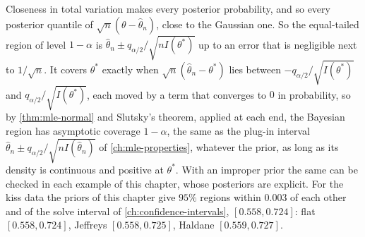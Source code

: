 
Closeness in total variation makes every posterior probability, and so every posterior quantile of $\sqrt{n}(\theta - \hat{\theta}_n)$, close to the Gaussian one.
So the equal-tailed region of level $1 - \alpha$ is $\hat{\theta}_n \pm q_{\alpha/2}/\sqrt{nI(\theta^*)}$ up to an error that is negligible next to $1/\sqrt{n}$.
It covers $\theta^*$ exactly when $\sqrt{n}(\hat{\theta}_n - \theta^*)$ lies between $-q_{\alpha/2}/\sqrt{I(\theta^*)}$ and $q_{\alpha/2}/\sqrt{I(\theta^*)}$, each moved by a term that converges to $0$ in probability, so by \cref{thm:mle-normal} and Slutsky's theorem, applied at each end, the Bayesian region has asymptotic coverage $1 - \alpha$, the same as the plug-in interval $\hat{\theta}_n \pm q_{\alpha/2}/\sqrt{nI(\hat{\theta}_n)}$ of \cref{ch:mle-properties}, whatever the prior, as long as its density is continuous and positive at $\theta^*$.
With an improper prior the same can be checked in each example of this chapter, whose posteriors are explicit.
For the kiss data the priors of this chapter give $95\%$ regions within $0.003$ of each other and of the solve interval of \cref{ch:confidence-intervals}, $[0.558, 0.724]$: flat $[0.558, 0.724]$, Jeffreys $[0.558, 0.725]$, Haldane $[0.559, 0.727]$.

